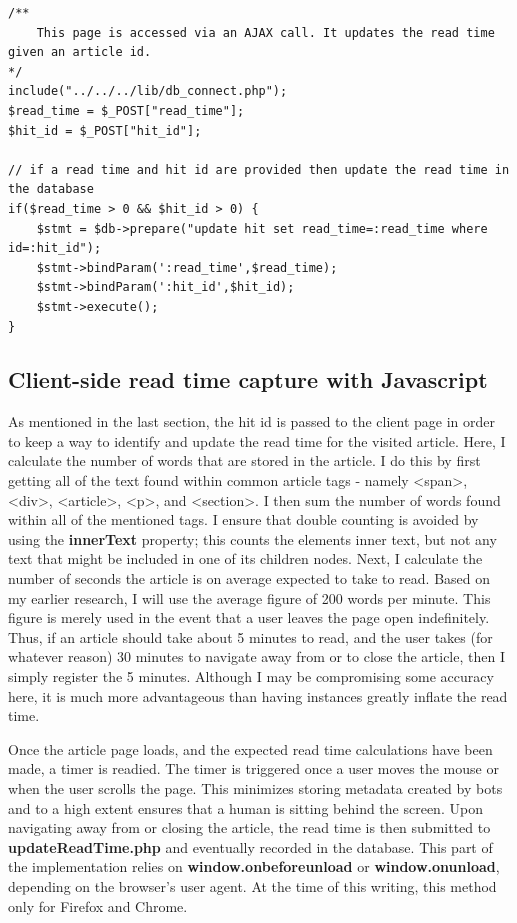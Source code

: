 \documentclass[12pt]{article}
\begin{document}
\begin{lstlisting}[basicstyle=\scriptsize]
/**
	This page is accessed via an AJAX call. It updates the read time given an article id.
*/
include("../../../lib/db_connect.php");
$read_time = $_POST["read_time"];
$hit_id = $_POST["hit_id"];

// if a read time and hit id are provided then update the read time in the database
if($read_time > 0 && $hit_id > 0) {
	$stmt = $db->prepare("update hit set read_time=:read_time where id=:hit_id");
	$stmt->bindParam(':read_time',$read_time);
	$stmt->bindParam(':hit_id',$hit_id);
	$stmt->execute();
}
\end{lstlisting} 
\vfill

\subsection{Client-side read time capture with Javascript}
As mentioned in the last section, the hit id is passed to the client page in order to keep a way to identify and update the read time for the visited article. Here, I calculate the number of words that are stored in the article. I do this by first getting all of the text found within common article tags - namely <span>, <div>, <article>, <p>, and <section>. I then sum the number of words found within all of the mentioned tags. I ensure that double counting is avoided by using the \textbf{innerText} property; this counts the elements inner text, but not any text that might be included in one of its children nodes. Next, I calculate the number of seconds the article is on average expected to take to read. Based on my earlier research, I will use the average figure of 200 words per minute. This figure is merely used in the event that a user leaves the page open indefinitely. Thus, if an article should take about 5 minutes to read, and the user takes (for whatever reason) 30 minutes to navigate away from or to close the article, then I simply register the 5 minutes. Although I may be compromising some accuracy here, it is much more advantageous than having instances greatly inflate the read time.

Once the article page loads, and the expected read time calculations have been made, a timer is readied. The timer is triggered once a user moves the mouse or when the user scrolls the page. This minimizes storing metadata created by bots and to a high extent ensures that a human is sitting behind the screen. Upon navigating away from or closing the article, the read time is then submitted to \textbf{updateReadTime.php} and eventually recorded in the database. This part of the implementation relies on \textbf{window.onbeforeunload} or \textbf{window.onunload}, depending on the browser's user agent. At the time of this writing, this method only for Firefox and Chrome.
\end{document}
